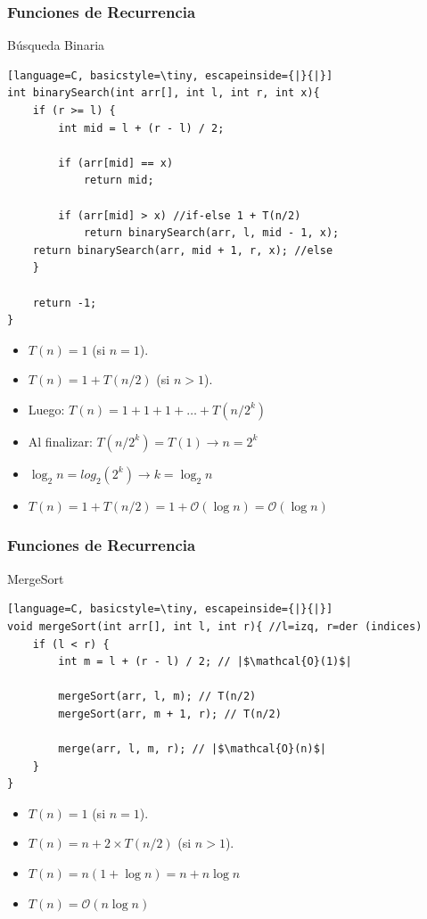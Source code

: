 \documentclass{beamer}
\begin{document}
\begin{frame}[fragile]
 \frametitle{Funciones de Recurrencia}
\small
\begin{exampleblock}{Búsqueda Binaria}
\begin{lstlisting}[language=C, basicstyle=\tiny, escapeinside={|}{|}]
int binarySearch(int arr[], int l, int r, int x){
    if (r >= l) {
        int mid = l + (r - l) / 2;

        if (arr[mid] == x) 
            return mid;

        if (arr[mid] > x) //if-else 1 + T(n/2)
            return binarySearch(arr, l, mid - 1, x);
	return binarySearch(arr, mid + 1, r, x); //else
    }

    return -1;
}
\end{lstlisting}
\end{exampleblock}


\begin{itemize}
\item $T(n) = 1$ (si $n = 1$).
\item $T(n) = 1+ T(n/2) $ (si $n > 1$).
\item Luego: $T(n) = 1 + 1 + 1 + \dots + T(n/2^k)$ \pause
\item Al finalizar: $T(n/2^k) = T(1) \rightarrow n = 2^k$ \pause
\item $\log_2 n  = log_2(2^k) \rightarrow k = \log_2 n $ \pause 
\item $ T(n) = 1 + T(n/2) = 1 + \mathcal{O}(\log n) = \mathcal{O}(\log n)$
\end{itemize}
\end{frame}


\begin{frame}[fragile]
 \frametitle{Funciones de Recurrencia}
\small
\begin{exampleblock}{MergeSort}
\begin{lstlisting}[language=C, basicstyle=\tiny, escapeinside={|}{|}]
void mergeSort(int arr[], int l, int r){ //l=izq, r=der (indices)
    if (l < r) {
        int m = l + (r - l) / 2; // |$\mathcal{O}(1)$|

        mergeSort(arr, l, m); // T(n/2)
        mergeSort(arr, m + 1, r); // T(n/2)

        merge(arr, l, m, r); // |$\mathcal{O}(n)$| 
    }
}

\end{lstlisting}
\end{exampleblock}


\begin{itemize}
\item $T(n) = 1$ (si $n = 1$).
\item $T(n) = n + 2 \times T(n/2) $ (si $n > 1$).
\item $T(n) = n (1 + \log n) = n + n \log n$
\item $T(n) = \mathcal{O}(n \log n) $
\end{itemize}
\end{frame}
\end{document}
